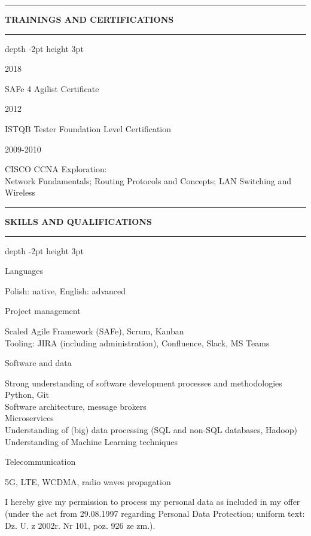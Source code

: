 \documentclass[a4paper]{article}
\makeatletter
\newcommand*{\thickhrulefill}{%
\color{nokiaBlue}
\leavevmode %
\leaders\hrule depth -2pt height 3pt \hfill
\kern 0pt\relax %
\color{black}
}
\newcommand*{\thickhrule}{%
\color{nokiaBlue}
\rule[2pt]{0.7cm}{1pt}
\color{black}
}
\def\cvsekcja#1{%
\vspace{0.1cm}
\noindent\thickhrule
\MakeUppercase{\textbf{\footnotesize#1}}
\hspace{0.1cm}\color{nokiaBlue}\thickhrulefill
}
\def\cvwpis#1#2{%
\noindent
\newline
\begin{minipage}[t]{0.2\textwidth}
  \begin{flushleft}
  #1 
\end{flushleft}
\end{minipage}
\begin{minipage}[t]{0.8\textwidth}
  #2
\end{minipage}
}
\makeatother
\begin{document}
\cvsekcja{Trainings and Certifications}

\cvwpis{2018}{SAFe 4 Agilist Certificate}
\cvwpis{2012}{ISTQB Tester Foundation Level Certification}
\cvwpis{2009-2010}{CISCO CCNA Exploration:\\
    Network Fundamentals;
    Routing Protocols and Concepts;
    LAN Switching and Wireless}

\cvsekcja{Skills and Qualifications}

\cvwpis{Languages} {Polish: native, English: advanced}
\vspace{5pt}
\cvwpis{Project management}{
    Scaled Agile Framework (SAFe), Scrum, Kanban\\
    Tooling: JIRA (including administration), Confluence, Slack, MS Teams}
\vspace{5pt}
\cvwpis{Software and data}{
    Strong understanding of software development processes and methodologies\\
    Python, Git \\
    Software architecture, message brokers \\
    Microservices \\
    Understanding of (big) data processing (SQL and non-SQL databases, Hadoop) \\
    Understanding of Machine Learning techniques}
\vspace{5pt}
\cvwpis{Telecommunication} {5G, LTE, WCDMA, radio waves propagation}
\vspace{5pt}


\vfill
\color{gray}
\begin{center} \tiny{
    I hereby give my permission to process my personal data as included in my offer
    (under the act from 29.08.1997 regarding Personal Data Protection; uniform text: Dz. U. z 2002r. Nr 101, 
    poz. 926 ze zm.).}
\end{center}
\end{document}
